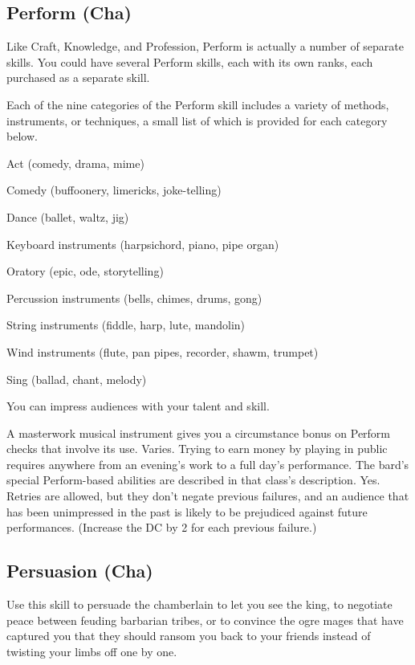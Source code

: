 \subsection{Perform (Cha)}
\par Like Craft, Knowledge, and Profession, Perform is actually a number of separate skills. You could have several Perform skills, each with its own ranks, each purchased as a separate skill.

Each of the nine categories of the Perform skill includes a variety of methods, instruments, or techniques, a small list of which is provided for each category below.
\begin{itemize*}
\item Act (comedy, drama, mime)
\item Comedy (buffoonery, limericks, joke-telling)
\item Dance (ballet, waltz, jig)
\item Keyboard instruments (harpsichord, piano, pipe organ)
\item Oratory (epic, ode, storytelling)
\item Percussion instruments (bells, chimes, drums, gong)
\item String instruments (fiddle, harp, lute, mandolin)
\item Wind instruments (flute, pan pipes, recorder, shawm, trumpet)
\item Sing (ballad, chant, melody)
\end{itemize*}
 You can impress audiences with your talent and skill.
\par A masterwork musical instrument gives you a  circumstance bonus on Perform checks that involve its use.
 Varies. Trying to earn money by playing in public requires anywhere from an evening's work to a full day's performance. The bard's special Perform-based abilities are described in that class's description.
 Yes. Retries are allowed, but they don't negate previous failures, and an audience that has been unimpressed in the past is likely to be prejudiced against future performances. (Increase the DC by 2 for each previous failure.)

\subsection{Persuasion (Cha)}
Use this skill to persuade the chamberlain to let you see the king, to negotiate peace between feuding barbarian tribes, or to convince the ogre mages that have captured you that they should ransom you back to your friends instead of twisting your limbs off one by one.

